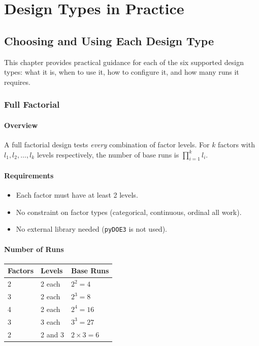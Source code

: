 \documentclass[11pt]{book}
\begin{document}
\part{Design Types in Practice}

\chapter{Choosing and Using Each Design Type}
\label{ch:designtypes}

This chapter provides practical guidance for each of the six supported design types: what it is, when to use it, how to configure it, and how many runs it requires.

\section{Full Factorial}

\subsection{Overview}

A full factorial design tests \emph{every} combination of factor levels. For $k$ factors with $l_1, l_2, \ldots, l_k$ levels respectively, the number of base runs is $\prod_{i=1}^{k} l_i$.

\subsection{Requirements}
\begin{itemize}[nosep]
  \item Each factor must have at least 2 levels.
  \item No constraint on factor types (categorical, continuous, ordinal all work).
  \item No external library needed (\texttt{pyDOE3} is not used).
\end{itemize}

\subsection{Number of Runs}

\begin{table}[H]
\centering
\begin{tabular}{@{}lll@{}}
\toprule
\textbf{Factors} & \textbf{Levels} & \textbf{Base Runs} \\
\midrule
2 & 2 each & $2^2 = 4$ \\
3 & 2 each & $2^3 = 8$ \\
4 & 2 each & $2^4 = 16$ \\
3 & 3 each & $3^3 = 27$ \\
2 & 2 and 3 & $2 \times 3 = 6$ \\
\bottomrule
\end{tabular}
\end{table}
\end{document}

